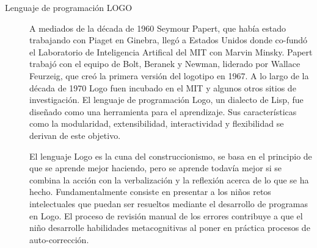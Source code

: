 \begin{description}

\item[Lenguaje de programación LOGO]  A mediados de la década de 1960 Seymour
	Papert, que había estado trabajando con Piaget en Ginebra, llegó a
	Estados Unidos donde co-fundó el Laboratorio de Inteligencia Artifical
	del MIT con Marvin Minsky. Papert trabajó con el equipo de Bolt, Beranek
	y Newman, liderado por Wallace Feurzeig, que creó la primera versión del
	logotipo en 1967. A lo largo de la década de 1970 Logo fuen incubado en
	el MIT y algunos otros sitios de investigación. El lenguaje de
	programación Logo, un dialecto de Lisp, fue diseñado como una
	herramienta para el aprendizaje. Sus características como la
	modularidad, extensibilidad, interactividad y flexibilidad se derivan de
	este objetivo. 

	El lenguaje Logo es la cuna del construccionismo, se basa en el
	principio de que se aprende mejor haciendo, pero se aprende todavía
	mejor si se combina la acción con la verbalización  y la reflexión
	acerca de lo que se ha hecho. Fundamentalmente consiste en presentar a
	los niños retos intelectuales que puedan ser resueltos mediante el
	desarrollo de programas en Logo. El proceso de revisión manual de los
	errores contribuye a que el niño desarrolle habilidades metacognitivas
	al poner en práctica procesos de auto-corrección\cite{logo:sg}.






\end{description}
